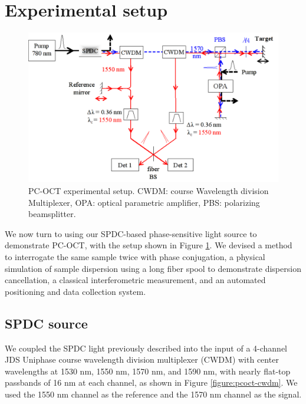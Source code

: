 \section{Experimental setup}

\begin{figure}[t]
\begin{center}
\includegraphics[width=16cm]{figure-pcoct-setup.pdf}
\caption{PC-OCT experimental setup. CWDM: course Wavelength division Multiplexer, OPA: optical parametric amplifier, PBS: polarizing beamsplitter.}
\label{figure:pcoct-setup}
\end{center}
\end{figure}

We now turn to using our SPDC-based phase-sensitive light source to demonstrate PC-OCT, with the setup shown in Figure \ref{figure:pcoct-setup}. We devised a method to interrogate the same sample twice with phase conjugation, a physical simulation of sample dispersion using a long fiber spool to demonstrate dispersion cancellation, a classical interferometric measurement, and an automated positioning and data collection system.

\subsection{SPDC source}

We coupled the SPDC light previously described into the input of a 4-channel JDS Uniphase course wavelength division multiplexer (CWDM) with center wavelengths at 1530 nm, 1550 nm, 1570 nm, and 1590 nm, with nearly flat-top passbands of 16 nm at each channel, as shown in Figure \ref{figure:pcoct-cwdm}. We used the 1550 nm channel as the reference and the 1570 nm channel as the signal.

